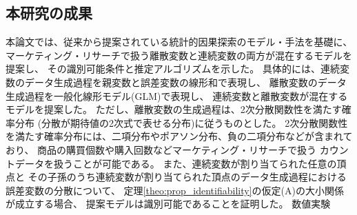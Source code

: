 
\subsection{本研究の成果}

本論文では、従来から提案されている統計的因果探索のモデル・手法を基礎に、
マーケティング・リサーチで扱う離散変数と連続変数の両方が混在するモデルを提案し、
その識別可能条件と推定アルゴリズムを示した。
具体的には、連続変数のデータ生成過程を親変数と誤差変数の線形和で表現し、
離散変数のデータ生成過程を一般化線形モデル(GLM)で表現し、
連続変数と離散変数が混在するモデルを提案した。
ただし、離散変数の生成過程は、2次分散関数性を満たす確率分布
(分散が期待値の2次式で表せる分布)に従うものとした。
2次分散関数性を満たす確率分布には、二項分布やポアソン分布、負の二項分布などが含まれており、
商品の購買個数や購入回数などマーケティング・リサーチで扱う
カウントデータを扱うことが可能である。
また、連続変数が割り当てられた任意の頂点と
その子孫のうち連続変数が割り当てられた頂点のデータ生成過程における誤差変数の分散について、
定理\ref{theo:prop_identifiability}の仮定(A)の大小関係が成立する場合、
提案モデルは識別可能であることを証明した。
数値実験
